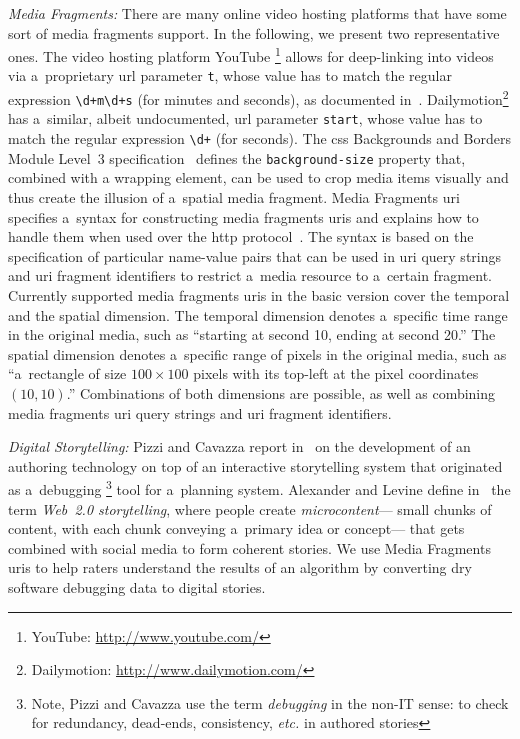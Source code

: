 \documentclass{article}
\begin{document}
\noindent \textit{Media Fragments:}
There are many online video hosting platforms
that have some sort of media fragments support.
In the following, we present two representative ones.
The video hosting platform YouTube%
\footnote{YouTube: \url{http://www.youtube.com/}}
allows for deep-linking into videos
via a~proprietary {\sc url} parameter \texttt{t},
whose value has to match the regular expression
\texttt{\textbackslash d+m\textbackslash d+s} (for minutes and seconds),
as documented in~\cite{youtube2008link}.
Dailymotion\footnote{Dailymotion: \url{http://www.dailymotion.com/}}
has a~similar, albeit undocumented, {\sc url} parameter \texttt{start},
whose value has to match the regular expression
\texttt{\textbackslash d+} (for seconds).
The {\sc css} Backgrounds and Borders Module Level~3 specification~\cite{bos2012css3}
defines the \texttt{background-size} property
that, combined with a wrapping element,
can be used to crop media items visually
and thus create the illusion of a~spatial media fragment.
Media Fragments {\sc uri}~\cite{troncy2012mediafragments} specifies
a~syntax for constructing media fragments {\sc uri}s
and explains how to handle them
when used over the {\sc http} protocol~\cite{fielding1999http}.
The syntax is based on the specification of particular name-value pairs
that can be used in {\sc uri} query strings and {\sc uri} fragment identifiers
to restrict a~media resource to a~certain fragment.
Currently supported media fragments {\sc uri}s in the basic version
cover the temporal and the spatial dimension.
The temporal dimension denotes a~specific time range in the original media,
such as ``starting at second 10, ending at second 20.''
The spatial dimension denotes a~specific range of pixels in the original media,
such as ``a~rectangle of size $ 100 \times 100 $ pixels
with its top-left at the pixel coordinates $ (10, 10) $.''
Combinations of both dimensions are possible,
as well as combining media fragments {\sc uri} query strings
and {\sc uri} fragment identifiers.

\noindent \textit{Digital Storytelling:}
Pizzi and Cavazza report in~\cite{pizzi2008debugging} on the development of
an authoring technology on top of an interactive storytelling system
that originated as a~debugging%
\footnote{Note, Pizzi and Cavazza use the term \emph{debugging} in the non-IT sense:
to check for redundancy, dead-ends, consistency, \emph{etc.} in authored stories}
tool for a~planning system.
Alexander and Levine define in~\cite{alexander2008storytelling}
the term \emph{Web~2.0 storytelling}, where people create \emph{microcontent}---%
small chunks of content, with each chunk conveying a~primary idea or concept---%
that gets combined with social media to form coherent stories.
We use Media Fragments {\sc uri}s to help raters understand
the results of an algorithm by converting dry software debugging data
to digital stories.
\end{document}
